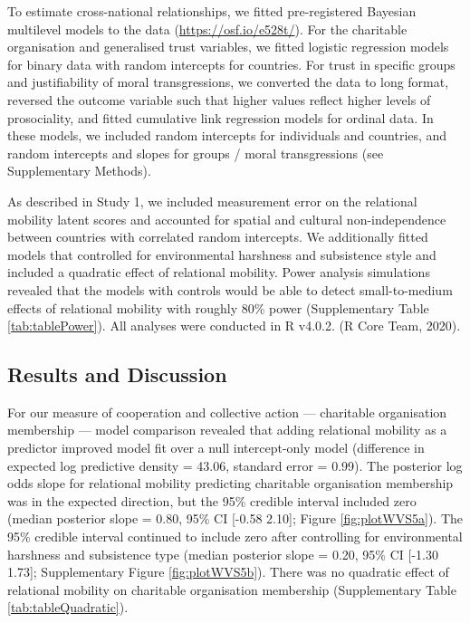 \documentclass[
  man,floatsintext]{apa6}
\begin{document}
To estimate cross-national relationships, we fitted pre-registered Bayesian multilevel models to the data (\url{https://osf.io/e528t/}). For the charitable organisation and generalised trust variables, we fitted logistic regression models for binary data with random intercepts for countries. For trust in specific groups and justifiability of moral transgressions, we converted the data to long format, reversed the outcome variable such that higher values reflect higher levels of prosociality, and fitted cumulative link regression models for ordinal data. In these models, we included random intercepts for individuals and countries, and random intercepts and slopes for groups / moral transgressions (see Supplementary Methods).

As described in Study 1, we included measurement error on the relational mobility latent scores and accounted for spatial and cultural non-independence between countries with correlated random intercepts. We additionally fitted models that controlled for environmental harshness and subsistence style and included a quadratic effect of relational mobility. Power analysis simulations revealed that the models with controls would be able to detect small-to-medium effects of relational mobility with roughly 80\% power (Supplementary Table \ref{tab:tablePower}). All analyses were conducted in R v4.0.2. (R Core Team, 2020).

\hypertarget{results-and-discussion-1}{%
\subsection{Results and Discussion}\label{results-and-discussion-1}}

For our measure of cooperation and collective action --- charitable organisation membership --- model comparison revealed that adding relational mobility as a predictor improved model fit over a null intercept-only model (difference in expected log predictive density = 43.06, standard error = 0.99). The posterior log odds slope for relational mobility predicting charitable organisation membership was in the expected direction, but the 95\% credible interval included zero (median posterior slope = 0.80, 95\% CI {[}-0.58 2.10{]}; Figure \ref{fig:plotWVS5a}). The 95\% credible interval continued to include zero after controlling for environmental harshness and subsistence type (median posterior slope = 0.20, 95\% CI {[}-1.30 1.73{]}; Supplementary Figure \ref{fig:plotWVS5b}). There was no quadratic effect of relational mobility on charitable organisation membership (Supplementary Table \ref{tab:tableQuadratic}).
\end{document}
